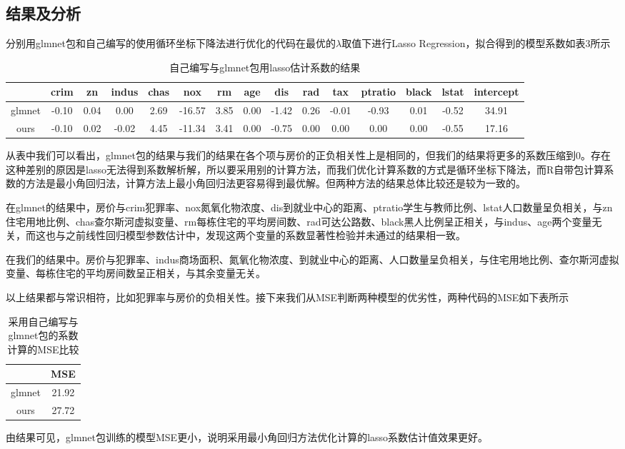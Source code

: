     \subsection{结果及分析}
    分别用glmnet包和自己编写的使用循环坐标下降法进行优化的代码在最优的$\lambda$取值下进行Lasso Regression，拟合得到的模型系数如表3所示
    \begin{table}[H]
        \centering
        \caption{自己编写与glmnet包用lasso估计系数的结果}
        \begin{tabular}{|c|c|c|c|c|c|c|c|c|c|c|c|c|c|c|}
        \hline
               & crim  & zn   & indus & chas & nox    & rm   & age  & dis   & rad  & tax   & ptratio & black & lstat & intercept \\ \hline
        glmnet & -0.10 & 0.04 & 0.00  & 2.69 & -16.57 & 3.85 & 0.00 & -1.42 & 0.26 & -0.01 & -0.93   & 0.01  & -0.52 & 34.91     \\ \hline
        ours   & -0.10 & 0.02 & -0.02 & 4.45 & -11.34 & 3.41 & 0.00 & -0.75 & 0.00 & 0.00  & 0.00    & 0.00  & -0.55 & 17.16     \\ \hline
        \end{tabular}
    \end{table}
    从表中我们可以看出，glmnet包的结果与我们的结果在各个项与房价的正负相关性上是相同的，但我们的结果将更多的系数压缩到0。存在这种差别的原因是lasso无法得到系数解析解，所以要采用别的计算方法，而我们优化计算系数的方式是循环坐标下降法，而R自带包计算系数的方法是最小角回归法，计算方法上最小角回归法更容易得到最优解。但两种方法的结果总体比较还是较为一致的。
    
    在glmnet的结果中，房价与crim犯罪率、nox氮氧化物浓度、dis到就业中心的距离、ptratio学生与教师比例、lstat人口数量呈负相关，与zn住宅用地比例、chas查尔斯河虚拟变量、rm每栋住宅的平均房间数、rad可达公路数、black黑人比例呈正相关，与indus、age两个变量无关，而这也与之前线性回归模型参数估计中，发现这两个变量的系数显著性检验并未通过的结果相一致。

    在我们的结果中。房价与犯罪率、indus商场面积、氮氧化物浓度、到就业中心的距离、人口数量呈负相关，与住宅用地比例、查尔斯河虚拟变量、每栋住宅的平均房间数呈正相关，与其余变量无关。

    以上结果都与常识相符，比如犯罪率与房价的负相关性。接下来我们从MSE判断两种模型的优劣性，两种代码的MSE如下表所示
    \begin{table}[H]
        \centering
        \caption{采用自己编写与glmnet包的系数计算的MSE比较}
        \begin{tabular}{|c|c|}
        \hline
               & MSE   \\ \hline
        glmnet & 21.92 \\ \hline
        ours   & 27.72 \\ \hline
        \end{tabular}
    \end{table}
    由结果可见，glmnet包训练的模型MSE更小，说明采用最小角回归方法优化计算的lasso系数估计值效果更好。

